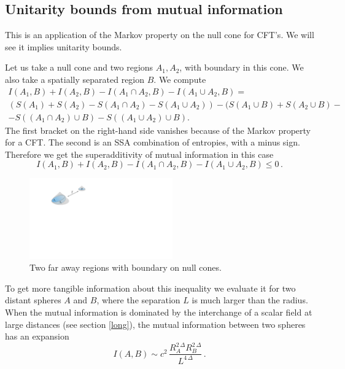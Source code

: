 \documentclass[11pt]{article}
\numberwithin{equation}{section}
\newcommand{\be}{\begin{equation}}
\newcommand{\ee}{\end{equation}}
\begin{document}
\subsection{Unitarity bounds from mutual information}
This is an application of the Markov property on the null cone for CFT's. We will see it implies unitarity bounds.  

Let us take a null cone and two regions $A_1, A_2$, with boundary in this cone. We also take a spatially separated region $B$. We compute
\begin{multline}
\!\!\!I(A_1,B)+I(A_2,B)-I(A_1\cap A_2,B)-I(A_1\cup A_2,B) = \\
(S(A_1)+S(A_2)-S(A_1\cap A_2)-S(A_1\cup A_2))
- (S(A_1\cup B)+S(A_2\cup B)- 
\\ - S((A_1\cap A_2)\cup B)-S((A_1\cup A_2)\cup B). 
\end{multline}
The first bracket on the right-hand side vanishes because of the Markov property for a CFT. The second is an SSA combination of entropies, with a minus sign. Therefore we get the superadditivity of mutual information in this case
\be
I(A_1,B)+I(A_2,B)-I(A_1\cap A_2,B)-I(A_1\cup A_2,B)\le 0\,.
\ee

\begin{figure}[t]
\begin{center}
\includegraphics[width=0.55\textwidth]{unitarity.pdf} 
\caption{Two far away regions with boundary on null cones.}
\label{unitarity}
\end{center}
\end{figure}


To get more tangible information about this inequality we evaluate it for two distant spheres $A$ and $B$, where the separation $L$ is much larger than the radius. When the mutual information is dominated by the interchange of a scalar field at large distances (see section \ref{long}), the mutual information between two spheres has an expansion
\be
I(A,B)\sim c^2\,\frac{R_A^{2\, \Delta} R_B^{2\, \Delta}}{L^{4 \,\Delta}}\,. \label{hjhj}
\ee
\end{document}
